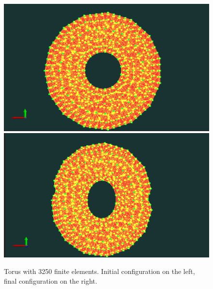 \documentclass[en]{minipw} %
\begin{document}
\begin{figure}[h!]
\centering
\includegraphics[scale=0.3]{pictures/tests/3252.png}
\includegraphics[scale=0.3]{pictures/tests/3252end.png}
\caption[Torus with 3250 finite elements]{Torus with 3250 finite elements. Initial configuration on the left, final configuration on the right.}
\label{fig:torus3250}
\end{figure}
\end{document}
